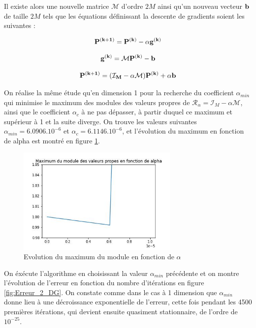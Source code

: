 \documentclass[12pt]{report}
\begin{document}
Il existe alors une nouvelle matrice $\mathcal{M}$ d'ordre $2M$ ainsi qu'un nouveau vecteur $\bf{b}$ de taille $2M$ tels que les 
équations définissant la descente de gradients soient les suivantes :

\begin{equation}
    \bf{P}^{(k+1)} = \bf{P}^{(k)} - \alpha\bf{g}^{(k)} 
\label{eq:équation récurrence descente gradients 2D}
\end{equation}

\begin{equation}
    \bf{g}^{(k)} = \mathcal{M}\bf{P}^{(k)} - \bf{b}
\label{eq:expression matricielle gradient 2D}
\end{equation}

\begin{equation}
    \bf{P}^{(k+1)} = (\mathcal{I}_M - \alpha \mathcal{M} )  \bf{P}^{(k)} + \alpha\bf{b}
\label{eq:équation récurrence descente gradients v2 2D}
\end{equation}

On réalise la même étude qu'en dimension 1 pour la recherche du coefficient $\alpha_{min}$ qui minimise le maximum
des modules des valeurs propres de $\mathcal{R}_\alpha = \mathcal{I}_M - \alpha \mathcal{M}$, ainsi que le coefficient 
$\alpha_c$ à ne pas dépasser, à partir duquel ce maximum et supérieur à 1 et la suite diverge.
On trouve les valeurs suivantes $\alpha_{min} = 6.0906.10^{-6}$ et $\alpha_c = 6.1146.10^{-6}$,  et l'évolution du 
maximum en fonction de alpha est montré en figure \ref{fig:choix_alpha_2D}.


\begin{figure}
    \centering
    \includegraphics[width=0.7\textwidth]{choix_alpha_2D.jpg}
    \caption{\label{fig:choix_alpha_2D}Evolution du maximum du module en fonction de $\alpha$}
\end{figure}

On éxécute l'algorithme en choisissant la valeur $\alpha_{min}$ précédente et on montre l'évolution de 
l'erreur en fonction du nombre d'itérations en figure \ref{fig:Erreur_2_DG}. 
On constate comme dans le cas à 1 dimension que $\alpha_{min}$ donne lieu à une décroissance exponentielle de l'erreur, 
cette fois pendant les 4500 premières itérations, qui devient ensuite quasiment stationnaire, de l'ordre de $10^{-25}$.
\end{document}
